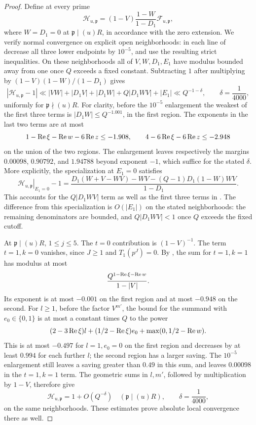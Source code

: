 \begin{proof}
Define at every prime
\[
 \mathcal H_{u,\mathfrak p}
   =(1-V)\frac{1-W}{1-D_1}\mathcal F_{u,\mathfrak p},
\]
where \(W=D_1=0\) at \(\mathfrak p\mid(u)R\), in accordance with the
zero extension.  We verify normal convergence on explicit open
neighborhoods: in each line of  decrease all three
lower endpoints by \(10^{-5}\), and use the resulting strict inequalities.
On these neighborhoods all of \(V,W,D_1,E_1\) have modulus bounded away
from one once \(Q\) exceeds a fixed constant.  Subtracting \(1\) after
multiplying  by
\((1-V)(1-W)/(1-D_1)\) gives
\begin{equation}
 |\mathcal H_{u,\mathfrak p}-1|
 \ll |VW|+|D_1V|+|D_1W|+Q|D_1WV|+|E_1|
 \ll Q^{-1-\delta},\qquad \delta=\frac1{4000},
\label{eq:Euler-good-error}
\end{equation}
uniformly for \(\mathfrak p\nmid(u)R\).  For clarity, before the
\(10^{-5}\) enlargement the weakest of the first three terms is
\(|D_1W|\le Q^{-1.001}\), in the first region.  The exponents in the
last two terms are at most
\[
 1-\operatorname{Re}\xi-\operatorname{Re} w-6\operatorname{Re} z\le-1.908,\qquad
 4-6\operatorname{Re}\xi-6\operatorname{Re} z\le-2.948
\]
on the union of the two regions.  The enlargement leaves respectively
the margins \(0.00098\), \(0.90792\), and \(1.94788\) beyond exponent
\(-1\), which suffice for the stated \(\delta\).  More explicitly,
the specialization at \(E_1=0\) satisfies
\[
 \left.\mathcal H_{u,\mathfrak p}\right|_{E_1=0}-1
 =\frac{D_1(W+V-WV)-WV-(Q-1)D_1(1-W)WV}{1-D_1}.
\]
This accounts for the \(Q|D_1WV|\) term as well as the first three
terms in .  The difference from this
specialization is \(O(|E_1|)\) on the stated neighborhoods: the remaining
denominators are bounded, and \(Q|D_1WV|<1\) once \(Q\) exceeds the fixed
cutoff.

At \(\mathfrak p\mid(u)R\), \(1\le j\le5\).  The \(t=0\) contribution
is \((1-V)^{-1}\).  The term \(t=1,k=0\) vanishes, since \(J\ge1\) and
\(T_1(p^J)=0\).  By , the sum for \(t=1,k=1\)
has modulus at most
\[
 \frac{Q^{1-\operatorname{Re}\xi-\operatorname{Re} w}}{1-|V|}.
\]
Its exponent is at most \(-0.001\) on the first region and at most
\(-0.948\) on the second.  For \(l\ge1\), before the factor \(V^{m'}\),
the bound for the summand with \(e_0\in\{0,1\}\) is at most a constant
times \(Q\) to the power
\begin{equation}
 (2-3\operatorname{Re}\xi)l+(1/2-\operatorname{Re}\xi)e_0
                    +\max(0,1/2-\operatorname{Re} w).
\label{eq:Euler-bad-exponents}
\end{equation}
This is at most \(-0.497\) for \(l=1,e_0=0\) on the first region and
decreases by at least \(0.994\) for each further \(l\); the second region
has a larger saving.  The \(10^{-5}\) enlargement still leaves a saving
greater than \(0.49\) in this sum, and leaves \(0.00098\) in the
\(t=1,k=1\) term.  The geometric sums in \(l,m'\), followed by
multiplication by \(1-V\), therefore give
\begin{equation}
 \mathcal H_{u,\mathfrak p}=1+O(Q^{-\delta})
 \quad(\mathfrak p\mid(u)R),\qquad \delta=\frac1{4000},
\label{eq:Euler-bad-error}
\end{equation}
on the same neighborhoods.  These estimates prove absolute local
convergence there as well.


\end{proof}
